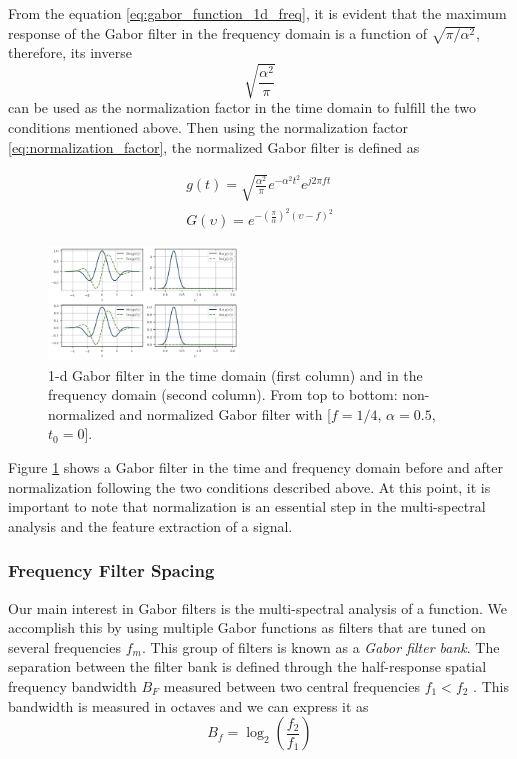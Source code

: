 \documentclass[journal]{IEEEtran}
\begin{document}
From the equation \eqref{eq:gabor_function_1d_freq}, it is evident that the maximum response of the Gabor filter in the frequency domain is a function of $\sqrt{\pi/\alpha^2}$, therefore, its inverse
\begin{equation}\label{eq:normalization_factor}
    \sqrt{\frac{\alpha^2}{\pi}}
\end{equation}
can be used as the normalization factor in the time domain to fulfill the two conditions mentioned above. Then using the normalization factor \eqref{eq:normalization_factor}, the normalized Gabor filter is defined as

\begin{equation}\label{eq:gabor_function_1d_timefreq_normalized}
    \begin{gathered}
         g(t) =  \sqrt{\frac{\alpha^2}{\pi}} e ^{-\alpha^2 t^2} e ^{j 2 \pi f t } \\
         G(\upsilon) =  e ^{-\left(\frac{\pi}{\alpha}\right) ^2 (\upsilon-f)^2}
     \end{gathered}
\end{equation}

\begin{figure}[!ht]
	\centering
	\includegraphics[width=0.45\textwidth]{GaborFilter_timefreq_1d_norm_efect}
	\caption{1-d Gabor filter in the time domain (first column) and in the frequency domain (second  column). From top to bottom: non-normalized and normalized Gabor filter with [$f =1/4$, $\alpha=0.5$, $t_0=0$].}\label{fig:GaborFilter_timefreq_norm_efect}
\end{figure}

Figure \ref{fig:GaborFilter_timefreq_norm_efect} shows a Gabor filter in the time and frequency domain before and after normalization following the two conditions described above. At this point, it is important to note that normalization is an essential step in the multi-spectral analysis and the feature extraction of a signal.

\subsubsection{Frequency Filter Spacing}\label{subsec:frequency_filter_spacing}
Our main interest in Gabor filters is the multi-spectral analysis of a function. We accomplish this by using multiple Gabor functions as filters that are tuned on several frequencies $f_m$. This group of filters is known as a \textit{Gabor filter bank}. The separation between the filter bank is defined through the half-response spatial frequency bandwidth $B_F$ measured between two central frequencies $f_1 < f_2$ \cite{Granlund:CGIP:1978}. This bandwidth is measured in octaves and we can express it as
\begin{equation}\label{eq:octave_spacing}
    B_f = \log_2 \left( \frac{f_2}{f_1} \right)
\end{equation}
\end{document}
